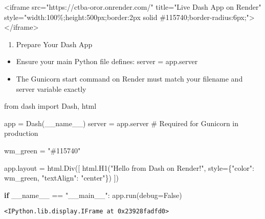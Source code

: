 \documentclass[
  letterpaper,
  DIV=11,
  numbers=noendperiod]{scrreprt}
\newenvironment{Shaded}{\begin{snugshade}}{\end{snugshade}}
\newcommand{\CommentTok}[1]{\textcolor[rgb]{0.37,0.37,0.37}{#1}}
\newcommand{\ControlFlowTok}[1]{\textcolor[rgb]{0.00,0.23,0.31}{\textbf{#1}}}
\newcommand{\ImportTok}[1]{\textcolor[rgb]{0.00,0.46,0.62}{#1}}
\newcommand{\NormalTok}[1]{\textcolor[rgb]{0.00,0.23,0.31}{#1}}
\newcommand{\OperatorTok}[1]{\textcolor[rgb]{0.37,0.37,0.37}{#1}}
\newcommand{\StringTok}[1]{\textcolor[rgb]{0.13,0.47,0.30}{#1}}
\newcommand{\VariableTok}[1]{\textcolor[rgb]{0.07,0.07,0.07}{#1}}
\providecommand{\tightlist}{%
  \setlength{\itemsep}{0pt}\setlength{\parskip}{0pt}}\usepackage{longtable,booktabs,array}
\begin{document}
\begin{Shaded}
\begin{Highlighting}[]
\NormalTok{\textless{}iframe src="https://ctba{-}oror.onrender.com/" title="Live Dash App on Render" style="width:100\%;height:500px;border:2px solid \#115740;border{-}radius:6px;"\textgreater{}\textless{}/iframe\textgreater{}}
\end{Highlighting}
\end{Shaded}

\begin{enumerate}
\def\labelenumi{\arabic{enumi})}
\tightlist
\item
  Prepare Your Dash App
\end{enumerate}

\begin{itemize}
\item
  Ensure your main Python file defines: server = app.server
\item
  The Gunicorn start command on Render must match your filename and
  server variable exactly
\end{itemize}

\begin{Shaded}
\begin{Highlighting}[]
\ImportTok{from}\NormalTok{ dash }\ImportTok{import}\NormalTok{ Dash, html}

\NormalTok{app }\OperatorTok{=}\NormalTok{ Dash(}\VariableTok{\_\_name\_\_}\NormalTok{)}
\NormalTok{server }\OperatorTok{=}\NormalTok{ app.server  }\CommentTok{\# Required for Gunicorn in production}

\NormalTok{wm\_green }\OperatorTok{=} \StringTok{"\#115740"}

\NormalTok{app.layout }\OperatorTok{=}\NormalTok{ html.Div([}
\NormalTok{    html.H1(}\StringTok{"Hello from Dash on Render!"}\NormalTok{, style}\OperatorTok{=}\NormalTok{\{}\StringTok{"color"}\NormalTok{: wm\_green, }\StringTok{"textAlign"}\NormalTok{: }\StringTok{"center"}\NormalTok{\})}
\NormalTok{])}

\ControlFlowTok{if} \VariableTok{\_\_name\_\_} \OperatorTok{==} \StringTok{"\_\_main\_\_"}\NormalTok{:}
\NormalTok{    app.run(debug}\OperatorTok{=}\VariableTok{False}\NormalTok{)}
\end{Highlighting}
\end{Shaded}

\begin{verbatim}
<IPython.lib.display.IFrame at 0x23928fadfd0>
\end{verbatim}
\end{document}
